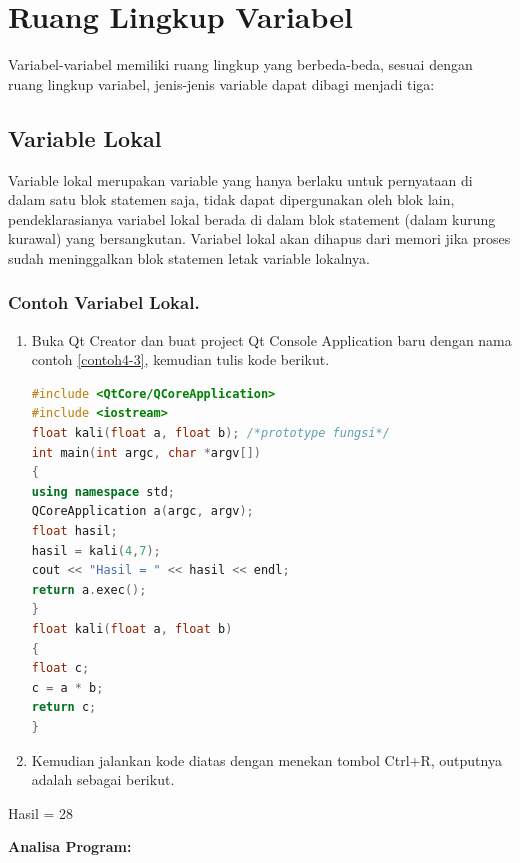 \section{Ruang Lingkup Variabel}\label{ruang-lingkup-variabel}

Variabel-variabel memiliki ruang lingkup yang berbeda-beda, sesuai
dengan ruang lingkup variabel, jenis-jenis variable dapat dibagi menjadi
tiga:

\subsection{Variable Lokal}\label{variable-lokal}

Variable lokal merupakan variable yang hanya berlaku untuk pernyataan di
dalam satu blok statemen saja, tidak dapat dipergunakan oleh blok lain,
pendeklarasianya variabel lokal berada di dalam blok statement (dalam
kurung kurawal) yang bersangkutan. Variabel lokal akan dihapus dari
memori jika proses sudah meninggalkan blok statemen letak variable
lokalnya.

\subsubsection*{Contoh  Variabel Lokal.}

\begin{enumerate}

\item
  Buka Qt Creator dan buat project Qt Console Application baru dengan
  nama contoh \ref{contoh4-3}, kemudian tulis kode berikut.

\begin{lstlisting}[language=c++, caption=Variabel Lokal, label=contoh4-3]
#include <QtCore/QCoreApplication>
#include <iostream>
float kali(float a, float b); /*prototype fungsi*/
int main(int argc, char *argv[])
{
using namespace std;
QCoreApplication a(argc, argv);
float hasil;
hasil = kali(4,7);
cout << "Hasil = " << hasil << endl;
return a.exec();
}
float kali(float a, float b)
{
float c;
c = a * b;
return c;
}
\end{lstlisting}
\item
  Kemudian jalankan kode diatas dengan menekan tombol Ctrl+R, outputnya
  adalah sebagai berikut.
\end{enumerate}

\begin{lcverbatim}
Hasil = 28
\end{lcverbatim}


\textbf{Analisa Program:}

